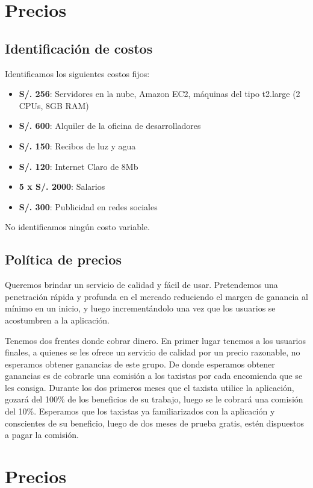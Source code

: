 \section{Precios}

\subsection{Identificación de costos}
\label{sec:costos}
Identificamos los siguientes costos fijos:

\begin{itemize}
\item \textbf{S/. 256}: Servidores en la nube, Amazon EC2, máquinas del tipo t2.large (2 CPUs, 8GB RAM)
\item \textbf{S/. 600}: Alquiler de la oficina de desarrolladores
\item \textbf{S/. 150}: Recibos de luz y agua
\item \textbf{S/. 120}: Internet Claro de 8Mb
\item \textbf{5 x S/. 2000}: Salarios
\item \textbf{S/. 300}: Publicidad en redes sociales
\end{itemize}

No identificamos ningún costo variable.

\subsection{Política de precios}

Queremos brindar un servicio de calidad y fácil de usar. Pretendemos una penetración rápida y profunda en el mercado reduciendo el margen de ganancia al mínimo en un inicio, y luego incrementándolo una vez que los usuarios se acostumbren a la aplicación.

Tenemos dos frentes donde cobrar dinero. En primer lugar tenemos a los usuarios finales, a quienes se les ofrece un servicio de calidad por un precio razonable, no esperamos obtener ganancias de este grupo. De donde esperamos obtener ganancias es de cobrarle una comisión a los taxistas por cada encomienda que se les consiga. Durante los dos primeros meses que el taxista utilice la aplicación, gozará del 100\% de los beneficios de su trabajo, luego se le cobrará una comisión del 10\%. Esperamos que los taxistas ya familiarizados con la aplicación y conscientes de su beneficio, luego de dos meses de prueba gratis, estén dispuestos a pagar la comisión.

\section{Precios}
